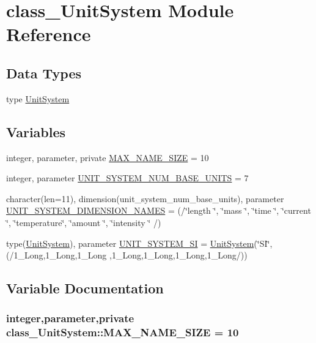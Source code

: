 \hypertarget{namespaceclass__UnitSystem}{
\section{class\_\-UnitSystem Module Reference}
\label{namespaceclass__UnitSystem}
}
\subsection*{Data Types}
\begin{DoxyCompactItemize}
\item 
type \hyperlink{typeclass__UnitSystem_1_1UnitSystem}{UnitSystem}
\end{DoxyCompactItemize}
\subsection*{Variables}
\begin{DoxyCompactItemize}
\item 
integer, parameter, private \hyperlink{namespaceclass__UnitSystem_a2dc5b6d848def3f7f8306f80535efdc3}{MAX\_\-NAME\_\-SIZE} = 10
\item 
integer, parameter \hyperlink{namespaceclass__UnitSystem_a246bc92fbae303b4776c58fbf2dde427}{UNIT\_\-SYSTEM\_\-NUM\_\-BASE\_\-UNITS} = 7
\item 
character(len=11), dimension(unit\_\-system\_\-num\_\-base\_\-units), parameter \hyperlink{namespaceclass__UnitSystem_a858e9cba24dcf0fd6b7858ee3acfaed0}{UNIT\_\-SYSTEM\_\-DIMENSION\_\-NAMES} = (/\char`\"{}length \char`\"{}, \char`\"{}mass \char`\"{}, \char`\"{}time \char`\"{}, \char`\"{}current \char`\"{}, \char`\"{}temperature\char`\"{}, \char`\"{}amount \char`\"{}, \char`\"{}intensity \char`\"{} /)
\item 
type(\hyperlink{typeclass__UnitSystem_1_1UnitSystem}{UnitSystem}), parameter \hyperlink{namespaceclass__UnitSystem_a45c989c4dd3741245372a6685f244345}{UNIT\_\-SYSTEM\_\-SI} = \hyperlink{typeclass__UnitSystem_1_1UnitSystem}{UnitSystem}(\char`\"{}SI\char`\"{}, (/1\_\-Long,1\_\-Long,1\_\-Long ,1\_\-Long,1\_\-Long,1\_\-Long,1\_\-Long/))
\end{DoxyCompactItemize}


\subsection{Variable Documentation}
\hypertarget{namespaceclass__UnitSystem_a2dc5b6d848def3f7f8306f80535efdc3}{
\subsubsection[{MAX\_\-NAME\_\-SIZE}]{\setlength{\rightskip}{0pt plus 5cm}integer,parameter,private {\bf class\_\-UnitSystem::MAX\_\-NAME\_\-SIZE} = 10}}
\label{namespaceclass__UnitSystem_a2dc5b6d848def3f7f8306f80535efdc3}


